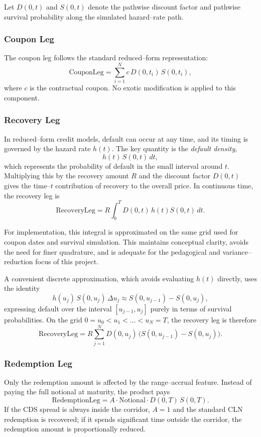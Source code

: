 Let $D(0,t)$ and $S(0,t)$ denote the pathwise discount factor and pathwise
survival probability along the simulated hazard--rate path.

\subsubsection*{Coupon Leg}

The coupon leg follows the standard reduced--form representation:
\[
\text{CouponLeg}
= \sum_{i=1}^N c\, D(0,t_i)\, S(0,t_i),
\]
where $c$ is the contractual coupon. No exotic modification is applied to this
component.

\subsubsection*{Recovery Leg}

In reduced--form credit models, default can occur at any time, and its timing is
governed by the hazard rate $h(t)$. The key quantity is the \emph{default
density},
\[
h(t)\, S(0,t)\, dt,
\]
which represents the probability of default in the small interval around $t$.
Multiplying this by the recovery amount $R$ and the discount factor $D(0,t)$
gives the time--$t$ contribution of recovery to the overall price. In continuous
time, the recovery leg is
\[
\text{RecoveryLeg}
= R \int_0^T D(0,t)\, h(t) S(0,t)\, dt.
\]

For implementation, this integral is approximated on the same grid used for
coupon dates and survival simulation. This maintains conceptual clarity, avoids
the need for finer quadrature, and is adequate for the pedagogical and
variance--reduction focus of this project.

A convenient discrete approximation, which avoids evaluating $h(t)$ directly,
uses the identity
\[
h(u_j)\, S(0,u_j)\, \Delta u_j
\approx S(0,u_{j-1}) - S(0,u_j),
\]
expressing default over the interval $[u_{j-1},u_j]$ purely in terms of survival
probabilities. On the grid $0 = u_0 < u_1 < \dots < u_N = T$, the recovery leg
is therefore
\[
\text{RecoveryLeg}
= R \sum_{j=1}^{N} D(0,u_j)\, \bigl(S(0,u_{j-1}) - S(0,u_j)\bigr).
\]

\subsubsection*{Redemption Leg}

Only the redemption amount is affected by the range--accrual feature. Instead of
paying the full notional at maturity, the product pays
\[
\text{RedemptionLeg}
= A \cdot \mathrm{Notional} \cdot D(0,T)\, S(0,T).
\]
If the CDS spread is always inside the corridor, $A = 1$ and the standard CLN
redemption is recovered; if it spends significant time outside the corridor, the
redemption amount is proportionally reduced.

